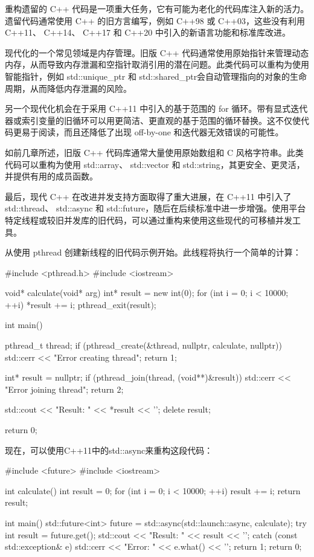 重构遗留的 C++ 代码是一项重大任务，它有可能为老化的代码库注入新的活力。遗留代码通常使用 C++ 的旧方言编写，例如 C++98 或 C++03，这些没有利用 C++11、 C++14、 C++17 和 C++20 中引入的新语言功能和标准库改进。

现代化的一个常见领域是内存管理。旧版 C++ 代码通常使用原始指针来管理动态内存，从而导致内存泄漏和空指针取消引用的潜在问题。此类代码可以重构为使用智能指针，例如 std::unique\_ptr 和 std::shared\_ptr会自动管理指向的对象的生命周期，从而降低内存泄漏的风险。

另一个现代化机会在于采用 C++11 中引入的基于范围的 for 循环。带有显式迭代器或索引变量的旧循环可以用更简洁、更直观的基于范围的循环替换。这不仅使代码更易于阅读，而且还降低了出现 off-by-one 和迭代器无效错误的可能性。

如前几章所述，旧版 C++ 代码库通常大量使用原始数组和 C 风格字符串。此类代码可以重构为使用 std::array、 std::vector 和 std::string，其更安全、更灵活，并提供有用的成员函数。

最后，现代 C++ 在改进并发支持方面取得了重大进展，在 C++11 中引入了 std::thread、 std::async 和 std::future，随后在后续标准中进一步增强。使用平台特定线程或较旧并发库的旧代码，可以通过重构来使用这些现代的可移植并发工具。

从使用 pthread 创建新线程的旧代码示例开始。此线程将执行一个简单的计算：

\begin{cpp}
#include <pthread.h>
#include <iostream>

void* calculate(void* arg) {
    int* result = new int(0);
    for (int i = 0; i < 10000; ++i)
        *result += i;
    pthread_exit(result);
}

int main() {
    pthread_t thread;
    if (pthread_create(&thread, nullptr, calculate, nullptr)) {
        std::cerr << "Error creating thread\n";
        return 1;
    }

    int* result = nullptr;
    if (pthread_join(thread, (void**)&result)) {
        std::cerr << "Error joining thread\n";
        return 2;
    }

    std::cout << "Result: " << *result << '\n';
    delete result;

    return 0;
}
\end{cpp}

现在，可以使用C++11中的std::async来重构这段代码：

\begin{cpp}
#include <future>
#include <iostream>

int calculate() {
    int result = 0;
    for (int i = 0; i < 10000; ++i)
        result += i;
    return result;
}

int main() {
    std::future<int> future = std::async(std::launch::async,
    calculate);
    try {
        int result = future.get();
        std::cout << "Result: " << result << '\n';
    } catch (const std::exception& e) {
        std::cerr << "Error: " << e.what() << '\n';
        return 1;
    }
    return 0;
}
\end{cpp}

